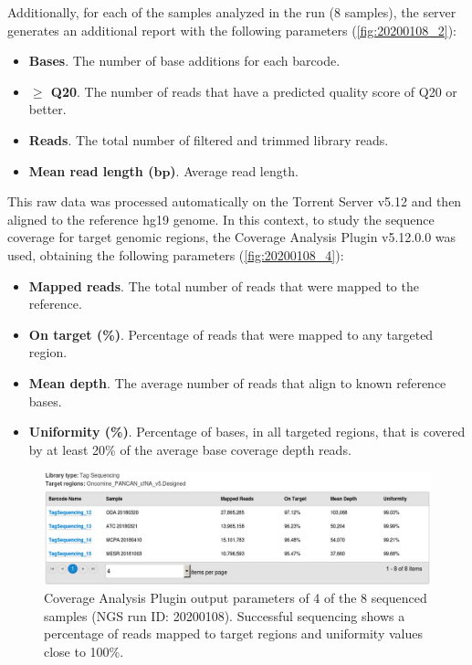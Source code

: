 Additionally, for each of the samples analyzed in the run (8 samples), the server generates an additional report with the following parameters (\autoref{fig:20200108_2}):
\begin{itemize}
    \item \textbf{Bases}. The number of base additions for each barcode.
    \item \textbf{$\boldsymbol{\ge}$ Q20}. The number of reads that have a predicted quality score of Q20 or better.
    \item \textbf{Reads}. The total number of filtered and trimmed library reads.
    \item \textbf{Mean read length ($\boldsymbol{bp}$)}. Average read length.
\end{itemize}

This raw data was processed automatically on the Torrent Server\texttrademark{} v5.12 and then aligned to the reference hg19 genome. In this context, to study the sequence coverage for target genomic regions, the Coverage Analysis Plugin v5.12.0.0 was used, obtaining the following parameters (\autoref{fig:20200108_4}):
\begin{itemize}
    \item \textbf{Mapped reads}. The total number of reads that were mapped to the reference.
    \item \textbf{On target (\%)}. Percentage of reads that were mapped to any targeted region.
    \item \textbf{Mean depth}. The average number of reads that align to known reference bases.
    \item \textbf{Uniformity (\%)}. Percentage of bases, in all targeted regions, that is covered by at least 20\% of the average base coverage depth reads.
\end{itemize}

\begin{figure}[t]
    \centering
    \includegraphics[width=\textwidth]{Images/chapter_3/20200108/20200108_4_v2.png}
    \caption{Coverage Analysis Plugin output parameters of 4 of the 8 sequenced samples (NGS run ID: 20200108). Successful sequencing shows a percentage of reads mapped to target regions and uniformity values close to 100\%.}
    \label{fig:20200108_4}
\end{figure}

